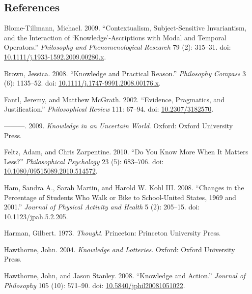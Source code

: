 \documentclass[
  11pt,
  letterpaper,
  DIV=11,
  numbers=noendperiod,
  twoside]{scrartcl}
\newlength{\cslhangindent}
\newenvironment{CSLReferences}[2] %
 {\begin{list}{}{%
  \setlength{\itemindent}{0pt}
  \setlength{\leftmargin}{0pt}
  \setlength{\parsep}{0pt}
  \ifodd #1
   \setlength{\leftmargin}{\cslhangindent}
   \setlength{\itemindent}{-1\cslhangindent}
  \fi
  \setlength{\itemsep}{#2\baselineskip}}}
 {\end{list}}
\begin{document}
\subsection*{References}\label{references}

\label{refs}
\begin{CSLReferences}{1}{0}
Blome-Tillmann, Michael. 2009. {``Contextualism, Subject-Sensitive
Invariantism, and the Interaction of {`Knowledge'}-Ascriptions with
Modal and Temporal Operators.''} \emph{Philosophy and Phenomenological
Research} 79 (2): 315--31. doi:
\href{https://doi.org/10.1111/j.1933-1592.2009.00280.x}{10.1111/j.1933-1592.2009.00280.x}.

Brown, Jessica. 2008. {``Knowledge and Practical Reason.''}
\emph{Philosophy Compass} 3 (6): 1135--52. doi:
\href{https://doi.org/10.1111/j.1747-9991.2008.00176.x}{10.1111/j.1747-9991.2008.00176.x}.

Fantl, Jeremy, and Matthew McGrath. 2002. {``Evidence, Pragmatics, and
Justification.''} \emph{Philosophical Review} 111: 67--94. doi:
\href{https://doi.org/10.2307/3182570}{10.2307/3182570}.

---------. 2009. \emph{Knowledge in an Uncertain World}. Oxford: Oxford
University Press.

Feltz, Adam, and Chris Zarpentine. 2010. {``Do You Know More When It
Matters Less?''} \emph{Philosophical Psychology} 23 (5): 683--706. doi:
\href{https://doi.org/10.1080/09515089.2010.514572}{10.1080/09515089.2010.514572}.

Ham, Sandra A., Sarah Martin, and Harold W. Kohl III. 2008. {``Changes
in the Percentage of Students Who Walk or Bike to School-United States,
1969 and 2001.''} \emph{Journal of Physical Activity and Health} 5 (2):
205--15. doi:
\href{https://doi.org/10.1123/jpah.5.2.205}{10.1123/jpah.5.2.205}.

Harman, Gilbert. 1973. \emph{Thought}. Princeton: Princeton University
Press.

Hawthorne, John. 2004. \emph{Knowledge and Lotteries}. Oxford: Oxford
University Press.

Hawthorne, John, and Jason Stanley. 2008. {``{Knowledge and Action}.''}
\emph{Journal of Philosophy} 105 (10): 571--90. doi:
\href{https://doi.org/10.5840/jphil20081051022}{10.5840/jphil20081051022}.


\end{CSLReferences}
\end{document}
